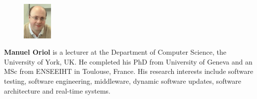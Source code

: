 \documentclass[conference]{IEEEtran}
\begin{document}


\bigskip
\begin{figure}
\vspace{-4pt}
\includegraphics[width=0.13\textwidth]{manuel.jpg}
\end{figure}
\noindent\textbf{Manuel Oriol} is a lecturer at the Department of Computer Science, the University of York, UK. He completed his PhD from University of Geneva and an MSc from ENSEEIHT in Toulouse, France. His research interests include software testing, software engineering, middleware, dynamic software updates, software architecture and real-time systems.
\end{document}
